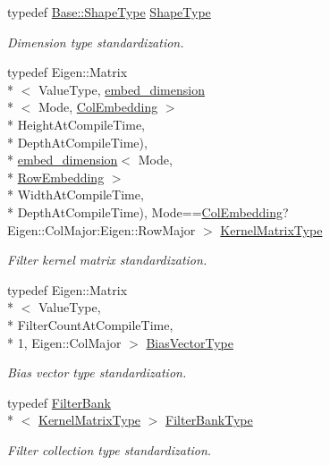\begin{DoxyCompactItemize}
typedef \hyperlink{classffnn_1_1layer_1_1internal_1_1_interface_a945709b1d0ea54a51539b80d04485f5f}{Base\-::\-Shape\-Type} \hyperlink{classffnn_1_1layer_1_1_convolution_volume_ae31080a107422dcfaff38eafadd69494}{Shape\-Type}
\begin{DoxyCompactList}\small\item\em Dimension type standardization. \end{DoxyCompactList}\item 
typedef Eigen\-::\-Matrix\\*
$<$ Value\-Type, \hyperlink{namespaceffnn_1_1layer_ad128f693900faa5bcf2cdd0ef8e7eee6}{embed\-\_\-dimension}\\*
$<$ Mode, \hyperlink{namespaceffnn_1_1layer_a254f16beba4fb335d935e9b43bb9e69aaede1065f5863208cae7e55561966a182}{Col\-Embedding} $>$\\*
Height\-At\-Compile\-Time, \\*
Depth\-At\-Compile\-Time), \\*
\hyperlink{namespaceffnn_1_1layer_ad128f693900faa5bcf2cdd0ef8e7eee6}{embed\-\_\-dimension}$<$ Mode, \\*
\hyperlink{namespaceffnn_1_1layer_a254f16beba4fb335d935e9b43bb9e69aa56bf723aeae4562f2fe05ae5e675da92}{Row\-Embedding} $>$\\*
Width\-At\-Compile\-Time, \\*
Depth\-At\-Compile\-Time), Mode==\hyperlink{namespaceffnn_1_1layer_a254f16beba4fb335d935e9b43bb9e69aaede1065f5863208cae7e55561966a182}{Col\-Embedding}?Eigen\-::\-Col\-Major\-:\-Eigen\-::\-Row\-Major $>$ \hyperlink{classffnn_1_1layer_1_1_convolution_volume_ad928a402aa7aa7e5fb3cd5b7f088f73e}{Kernel\-Matrix\-Type}
\begin{DoxyCompactList}\small\item\em Filter kernel matrix standardization. \end{DoxyCompactList}\item 
typedef Eigen\-::\-Matrix\\*
$<$ Value\-Type, \\*
Filter\-Count\-At\-Compile\-Time, \\*
1, Eigen\-::\-Col\-Major $>$ \hyperlink{classffnn_1_1layer_1_1_convolution_volume_ac2655aee05415e5ffc76cf7b0ba64e61}{Bias\-Vector\-Type}
\begin{DoxyCompactList}\small\item\em Bias vector type standardization. \end{DoxyCompactList}\item 
typedef \hyperlink{classffnn_1_1layer_1_1_filter_bank}{Filter\-Bank}\\*
$<$ \hyperlink{classffnn_1_1layer_1_1_convolution_volume_ad928a402aa7aa7e5fb3cd5b7f088f73e}{Kernel\-Matrix\-Type} $>$ \hyperlink{classffnn_1_1layer_1_1_convolution_volume_a73cb805b7ffa2bc96461412e1cf958f9}{Filter\-Bank\-Type}
\begin{DoxyCompactList}\small\item\em Filter collection type standardization. \end{DoxyCompactList}\end{DoxyCompactItemize}

